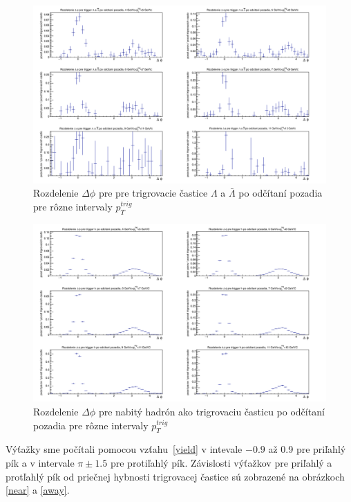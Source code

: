 \documentclass[thesismargins, thesislinespacing]{rnthesis}
\begin{document}
\begin{figure}[hbtp!]
	\centering
	\includegraphics[width=\textwidth]{./Obrazky_praca/DeltaPhiLH.png}
	\caption{Rozdelenie $\Delta \phi$ pre pre trigrovacie častice $\Lambda$ a $\bar{\Lambda}$  po odčítaní pozadia pre rôzne intervaly $p_T^{trig}$}
	\label{lambda}
\end{figure}

\begin{figure}[hbtp!]
	\centering
	\includegraphics[width=\textwidth]{./Obrazky_praca/DeltaPhiHH.png}
	\caption{Rozdelenie $\Delta \phi$ pre nabitý hadrón ako trigrovaciu časticu po odčítaní pozadia pre rôzne intervaly $p_T^{trig}$}
	\label{hh}
\end{figure}
\newpage

Výťažky sme počítali pomocou vzťahu~\ref{yield} v intevale $-0.9$ až 0.9 pre priľahlý pík a v intervale $\pi\pm1.5$ pre protiľahlý pík. Závislosti výťažkov pre priľahlý a protľahlý pík od priečnej hybnosti trigrovacej častice sú zobrazené na obrázkoch \ref{near} a \ref{away}.
\end{document}
